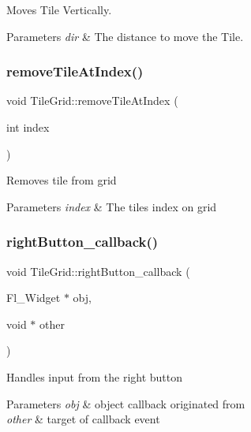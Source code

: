 Moves Tile Vertically.


\begin{DoxyParams}{Parameters}
{\em dir} & The distance to move the Tile. \\
\hline
\end{DoxyParams}
\mbox{\label{classTileGrid_ab5e670e6b91d87ea12237d25f65b5f2a}} 
\subsubsection{\texorpdfstring{remove\+Tile\+At\+Index()}{removeTileAtIndex()}}
{\footnotesize\ttfamily void Tile\+Grid\+::remove\+Tile\+At\+Index (\begin{DoxyParamCaption}\item[{int}]{index }\end{DoxyParamCaption})}

Removes tile from grid


\begin{DoxyParams}{Parameters}
{\em index} & The tile\textquotesingle{}s index on grid \\
\hline
\end{DoxyParams}
\mbox{\label{classTileGrid_a2f95e4a1e0111c81c7eea715dd8cf030}} 
\subsubsection{\texorpdfstring{right\+Button\+\_\+callback()}{rightButton\_callback()}}
{\footnotesize\ttfamily void Tile\+Grid\+::right\+Button\+\_\+callback (\begin{DoxyParamCaption}\item[{Fl\+\_\+\+Widget $\ast$}]{obj,  }\item[{void $\ast$}]{other }\end{DoxyParamCaption})\hspace{0.3cm}{\ttfamily [static]}}

Handles input from the right button


\begin{DoxyParams}{Parameters}
{\em obj} & object callback originated from \\
\hline
{\em other} & target of callback event \\
\hline
\end{DoxyParams}
\mbox{\label{classTileGrid_a599c5125eee64b38972ad27027ab3def}} 
